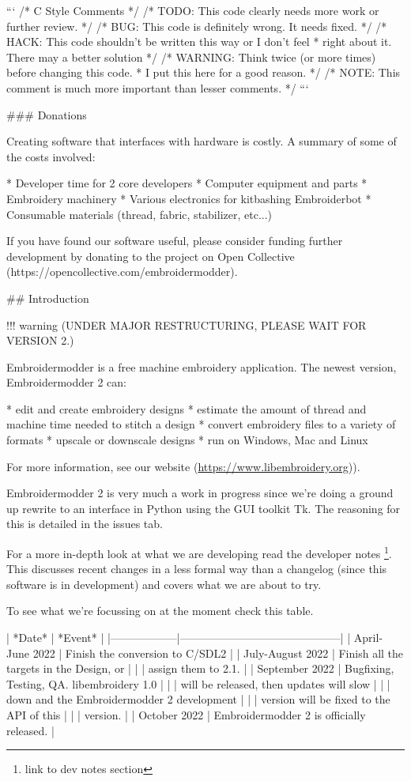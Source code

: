 ```
/* C Style Comments */
/* TODO: This code clearly needs more work or further review. */
/* BUG: This code is definitely wrong. It needs fixed. */
/* HACK: This code shouldn't be written this way or I don't feel
 * right about it. There may a better solution */
/* WARNING: Think twice (or more times) before changing this code.
 * I put this here for a good reason. */
/* NOTE: This comment is much more important than lesser comments. */
```

### Donations

Creating software that interfaces with hardware is costly. A summary
of some of the costs involved:

* Developer time for 2 core developers
* Computer equipment and parts
* Embroidery machinery
* Various electronics for kitbashing Embroiderbot
* Consumable materials (thread, fabric, stabilizer, etc...)

If you have found our software useful, please consider funding further
development by donating to the project on Open Collective
(https://opencollective.com/embroidermodder).

## Introduction

!!! warning
    (UNDER MAJOR RESTRUCTURING, PLEASE WAIT FOR VERSION 2.)

Embroidermodder is a free machine embroidery application.
The newest version, Embroidermodder 2 can:

* edit and create embroidery designs
* estimate the amount of thread and machine time needed to stitch a design
* convert embroidery files to a variety of formats
* upscale or downscale designs
* run on Windows, Mac and Linux

For more information, see our website (\url{https://www.libembroidery.org})).

Embroidermodder 2 is very much a work in progress since we're doing a ground up
rewrite to an interface in Python using the GUI toolkit Tk. The reasoning for
this is detailed in the issues tab.

For a more in-depth look at what we are developing read the developer notes
\footnote{link to dev notes section}. This discusses recent changes in a less
formal way than a changelog (since this software is in development) and covers
what we are about to try.

To see what we're focussing on at the moment check this table.

|           *Date* |                                    *Event* |
|------------------|--------------------------------------------|
| April-June 2022  | Finish the conversion to C/SDL2            |
| July-August 2022 | Finish all the targets in the Design, or   |
|                  | assign them to 2.1.                        |
| September 2022   | Bugfixing, Testing, QA. libembroidery 1.0  |
|                  | will be released, then updates will slow   |
|                  | down and the Embroidermodder 2 development |
|                  | version will be fixed to the API of this   |
|                  | version.                                   |
| October 2022     | Embroidermodder 2 is officially released.  |

